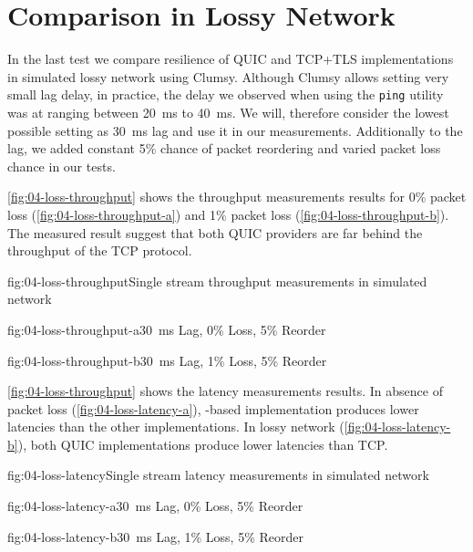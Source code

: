 \section{Comparison in Lossy Network}

In the last test we compare resilience of QUIC and TCP+TLS implementations in simulated lossy
network using Clumsy. Although Clumsy allows setting very small lag delay, in practice, the delay we
observed when using the \texttt{ping} utility was at ranging between \SI{20}{\milli\second} to
\SI{40}{\milli\second}. We will, therefore consider the lowest possible setting as
\SI{30}{\milli\second} lag and use it in our measurements. Additionally to the lag, we added
constant 5\% chance of packet reordering and varied packet loss chance in our tests.

\autoref{fig:04-loss-throughput} shows the throughput measurements results for 0\% packet loss
(\autoref{fig:04-loss-throughput-a}) and 1\% packet loss (\autoref{fig:04-loss-throughput-b}). The
measured result suggest that both QUIC providers are far behind the throughput of the TCP protocol.

\begin{myFigure}{fig:04-loss-throughput}{Single stream throughput measurements in simulated network}
\begin{mySubfigure}{0.49\linewidth}{fig:04-loss-throughput-a}{\SI{30}{\milli\second} Lag, 0\% Loss, 5\% Reorder}
\footnotesize

\end{mySubfigure}
\begin{mySubfigure}{0.49\linewidth}{fig:04-loss-throughput-b}{\SI{30}{\milli\second} Lag, 1\% Loss, 5\% Reorder}
\footnotesize

\end{mySubfigure}
\end{myFigure}

\autoref{fig:04-loss-throughput} shows the latency measurements results. In absence of packet loss
(\autoref{fig:04-loss-latency-a}), \libmsquic{}-based implementation produces lower latencies than
the other implementations. In lossy network (\autoref{fig:04-loss-latency-b}), both QUIC
implementations produce lower latencies than TCP.

\begin{myFigure}{fig:04-loss-latency}{Single stream latency measurements in simulated network}
\begin{mySubfigure}{0.49\linewidth}{fig:04-loss-latency-a}{\SI{30}{\milli\second} Lag, 0\% Loss, 5\% Reorder}
\footnotesize

\end{mySubfigure}
\begin{mySubfigure}{0.49\linewidth}{fig:04-loss-latency-b}{\SI{30}{\milli\second} Lag, 1\% Loss, 5\% Reorder}
\footnotesize

\end{mySubfigure}
\end{myFigure}

